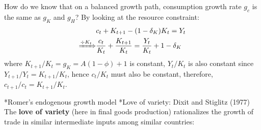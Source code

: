 \documentclass[10pt,landscape,a4paper]{article}
\makeatletter
\renewcommand{\section}{\@startsection{section}{1}{0mm}{1ex}{.2ex}{\normalsize\bfseries}}
\renewcommand{\subsection}{\@startsection{subsection}{1}{0mm}{.2ex}{.2ex}{\bfseries}}
\makeatother
\begin{document}
\begin{multicols*}{4}

How do we know that on a balanced growth path, consumption growth rate $g_c$ is the same as $g_K$ and $g_H$? By looking at the resource constraint:
\begin{align*}
    & c_t+K_{t+1}-(1-\delta_K)K_t =Y_t\\
    \xRightarrow{\div K_t} &  \frac{c_t}{K_t}+\frac{K_{t+1}}{K_t}=\frac{Y_t}{K_t}+1-\delta_K
\end{align*}
where $K_{t+1}/K_t=g_K =A(1-\phi)+1 $ is constant, $Y_t/K_t$ is also constant since $Y_{t+1}/Y_t=K_{t+1}/K_t$, hence $c_t/K_t$ must also be constant, therefore, $c_{t+1}/c_{t}=K_{t+1}/K_t$.


\newpage

\section*{Romer's endogenous growth model}
\subsection*{Love of variety: Dixit and Stiglitz (1977)}
The \textbf{love of variety} (here in final goods production) rationalizes the growth of trade in similar intermediate inputs among similar countries: 


\end{multicols*}
\end{document}
